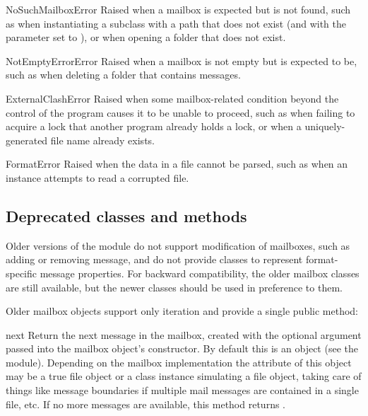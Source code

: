 \begin{classdesc}{NoSuchMailboxError}{}
Raised when a mailbox is expected but is not found, such as when instantiating
a  subclass with a path that does not exist (and with the
 parameter set to ), or when opening a folder that does
not exist.
\end{classdesc}

\begin{classdesc}{NotEmptyErrorError}{}
Raised when a mailbox is not empty but is expected to be, such as when deleting
a folder that contains messages.
\end{classdesc}

\begin{classdesc}{ExternalClashError}{}
Raised when some mailbox-related condition beyond the control of the program
causes it to be unable to proceed, such as when failing to acquire a lock that
another program already holds a lock, or when a uniquely-generated file name
already exists.
\end{classdesc}

\begin{classdesc}{FormatError}{}
Raised when the data in a file cannot be parsed, such as when an 
instance attempts to read a corrupted  file.
\end{classdesc}

\subsection{Deprecated classes and methods}
\label{mailbox-deprecated}

Older versions of the  module do not support modification of
mailboxes, such as adding or removing message, and do not provide classes to
represent format-specific message properties. For backward compatibility, the
older mailbox classes are still available, but the newer classes should be used
in preference to them.

Older mailbox objects support only iteration and provide a single public
method:

\begin{methoddesc}{next}{}
Return the next message in the mailbox, created with the optional 
argument passed into the mailbox object's constructor. By default this is an
 object (see the  module).  Depending
on the mailbox implementation the  attribute of this object may be a
true file object or a class instance simulating a file object, taking care of
things like message boundaries if multiple mail messages are contained in a
single file, etc.  If no more messages are available, this method returns
.
\end{methoddesc}

